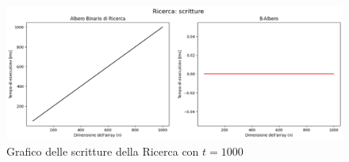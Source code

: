 \begin{figure}[H]
    \centering
    \includegraphics[width=\textwidth]{side-graphs/search-w-t1000.png}
    \caption{Grafico delle scritture della Ricerca con $t=1000$}
    \label{fig:sidegraphsearchwrite1000}
\end{figure}

